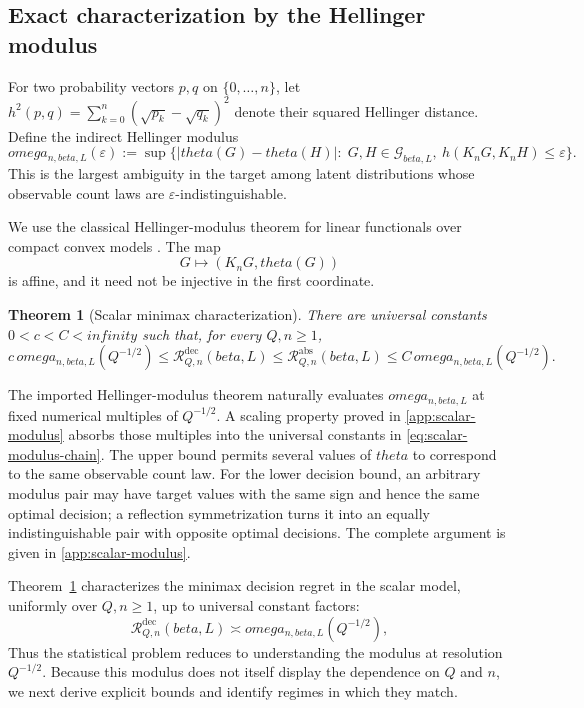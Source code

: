 \documentclass[11pt]{article}
\def\beta{beta}%
\def\theta{theta}%
\def\omega{omega}%
\def\infty{infinity}%
\newtheorem{theorem}{Theorem}[section]
\newcommand{\calG}{\mathcal G}
\newcommand{\calR}{\mathcal R}
\newcommand{\eps}{\varepsilon}
\newcommand\aed[1]{{\color{magenta!60!black} #1}}
\newcommand\eed[1]{{\color{green!45!black} #1}}
\begin{document}
\subsection{Exact characterization by the Hellinger modulus}

\eed{For two probability vectors $p,q$ on $\{0,\dots,n\}$, let
$h^2(p,q)=\sum_{k=0}^n(\sqrt{p_k}-\sqrt{q_k})^2$
denote their squared Hellinger distance.}
Define the indirect \aed{Hellinger} modulus
\begin{equation}
\label{eq:modulus}
\omega_{n,\beta,L}(\eps)
:=
\sup\bigl\{
|\theta(G)-\theta(H)|:\;
G,H\in\calG_{\beta,L},
\ h(K_nG,K_nH)\le\eps
\bigr\}.
\end{equation}
This is the largest ambiguity in the target among latent distributions whose observable count laws are $\eps$-indistinguishable.

We use the classical Hellinger-modulus theorem for linear functionals over compact convex models \citep{DonohoLiuII,JuditskyNemirovski}.  The map
\[
G\mapsto(K_nG,\theta(G))
\]
is affine, and it need not be injective in the first coordinate.

\begin{theorem}[Scalar minimax characterization]
\label{thm:scalar-modulus}
There are universal constants $0<c<C<\infty$ such that, for every $Q,n\ge1$,
\begin{equation}
\label{eq:scalar-modulus-chain}
c\,\omega_{n,\beta,L}(Q^{-1/2})
\le
\calR^{\mathrm{dec}}_{Q,n}(\beta,L)
\le
\calR^{\mathrm{abs}}_{Q,n}(\beta,L)
\le
C\,\omega_{n,\beta,L}(Q^{-1/2}).
\end{equation}
\end{theorem}

\eed{The imported Hellinger-modulus theorem naturally evaluates $\omega_{n,\beta,L}$ at fixed numerical multiples of $Q^{-1/2}$.  A scaling property proved in \cref{app:scalar-modulus} absorbs those multiples into the universal constants in \eqref{eq:scalar-modulus-chain}.  The upper bound permits several values of $\theta$ to correspond to the same observable count law.  For the lower decision bound, an arbitrary modulus pair may have target values with the same sign and hence the same optimal decision; a reflection symmetrization turns it into an equally indistinguishable pair with opposite optimal decisions.  The complete argument is given in \cref{app:scalar-modulus}.}

\aed{Theorem~\ref{thm:scalar-modulus} characterizes the minimax decision
regret in the scalar model, uniformly over $Q,n\ge1$, up to universal
constant factors:
\begin{equation}
\label{eq:scalar-modulus-succinct}
\calR^{\mathrm{dec}}_{Q,n}(\beta,L)
\asymp
\omega_{n,\beta,L}(Q^{-1/2}),
\end{equation}
Thus the statistical problem reduces to understanding the modulus at
resolution $Q^{-1/2}$.  Because this modulus does not itself display the
dependence on $Q$ and $n$, we next derive explicit bounds and identify
regimes in which they match.}
\end{document}
